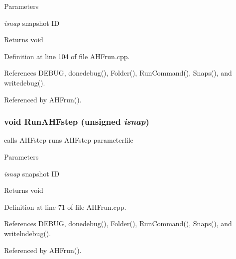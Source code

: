 \begin{DoxyParams}{Parameters}
\item[{\em isnap}]snapshot ID \end{DoxyParams}
\begin{DoxyReturn}{Returns}
void 
\end{DoxyReturn}


Definition at line 104 of file AHFrun.cpp.



References DEBUG, donedebug(), Folder(), RunCommand(), Snaps(), and writedebug().



Referenced by AHFrun().

\subsubsection[{RunAHFstep}]{\setlength{\rightskip}{0pt plus 5cm}void RunAHFstep (unsigned {\em isnap})}\label{AHFrun_8cpp_a18d1ee9bcd4bd82bd3723ad782f96baa}


calls AHFstep runs AHFstep parameterfile 


\begin{DoxyParams}{Parameters}
\item[{\em isnap}]snapshot ID \end{DoxyParams}
\begin{DoxyReturn}{Returns}
void 
\end{DoxyReturn}


Definition at line 71 of file AHFrun.cpp.



References DEBUG, donedebug(), Folder(), RunCommand(), Snaps(), and writelndebug().



Referenced by AHFrun().

